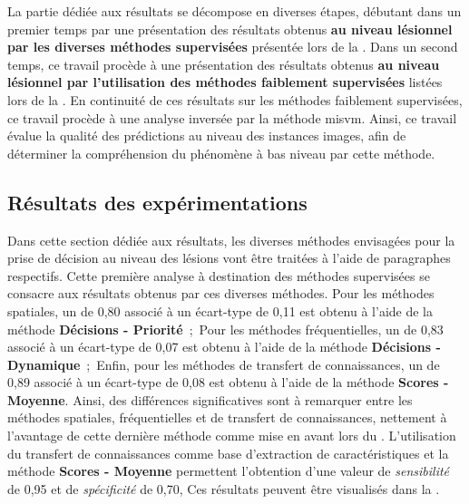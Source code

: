 La partie dédiée aux résultats se décompose en diverses étapes, débutant dans un premier temps par une présentation des résultats obtenus \textbf{au niveau lésionnel par les diverses méthodes supervisées} présentée lors de la . Dans un second temps, ce travail procède à une présentation des résultats obtenus \textbf{au niveau lésionnel par l'utilisation des méthodes faiblement supervisées} listées lors de la . En continuité de ces résultats sur les méthodes faiblement supervisées, ce travail procède à une analyse inversée par la méthode \gls{misvm}. Ainsi, ce travail évalue la qualité des prédictions au niveau des instances images, afin de déterminer la compréhension du phénomène à bas niveau par cette méthode.\par
\clearpage

\subsection{Résultats des expérimentations}
Dans cette section dédiée aux résultats, les diverses méthodes envisagées pour la prise de décision au niveau des lésions vont être traitées à l'aide de paragraphes respectifs. Cette première analyse à destination des méthodes supervisées se consacre aux résultats obtenus par ces diverses méthodes. Pour les méthodes spatiales, un \fscore{} de 0,80 associé à un écart-type de 0,11 est obtenu à l'aide de la méthode \textbf{Décisions - Priorité}~;~Pour les méthodes fréquentielles, un \fscore{} de 0,83 associé à un écart-type de 0,07 est obtenu à l'aide de la méthode \textbf{Décisions - Dynamique}~;~Enfin, pour les méthodes de transfert de connaissances, un \fscore{} de 0,89 associé à un écart-type de 0,08 est obtenu à l'aide de la méthode \textbf{Scores - Moyenne}. Ainsi, des différences significatives sont à remarquer entre les méthodes spatiales, fréquentielles et de transfert de connaissances, nettement à l'avantage de cette dernière méthode comme mise en avant lors du . L'utilisation du transfert de connaissances comme base d'extraction de caractéristiques et la méthode \textbf{Scores - Moyenne} permettent l'obtention d'une valeur de \textit{sensibilité} de 0,95 et de \textit{spécificité} de 0,70, Ces résultats peuvent être visualisés dans la .\par

